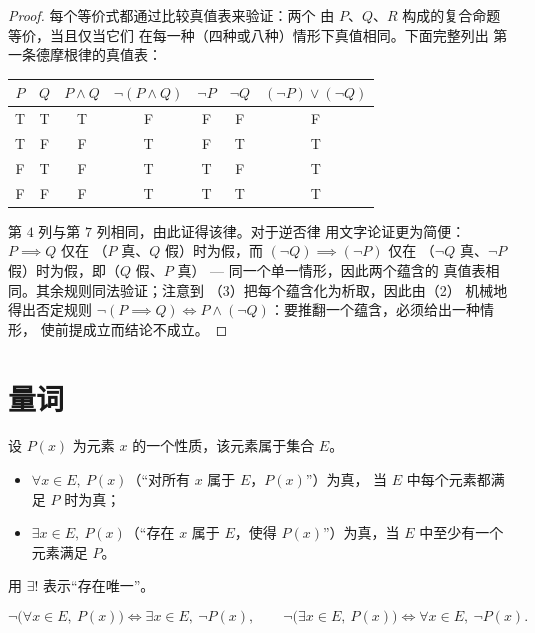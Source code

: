 \begin{proof}
每个等价式都通过比较真值表来验证：两个
由 $P$、$Q$、$R$ 构成的复合命题等价，当且仅当它们
在每一种（四种或八种）情形下真值相同。下面完整列出
第一条德摩根律的真值表：
\begin{center}
\begin{tabular}{cc|c|c|cc|c}
$P$ & $Q$ & $P \land Q$ & $\lnot(P \land Q)$ & $\lnot P$ & $\lnot Q$ &
$(\lnot P) \lor (\lnot Q)$ \\
\hline
T & T & T & F & F & F & F \\
T & F & F & T & F & T & T \\
F & T & F & T & T & F & T \\
F & F & F & T & T & T & T \\
\end{tabular}
\end{center}
第 $4$ 列与第 $7$ 列相同，由此证得该律。对于逆否律
用文字论证更为简便：$P \implies Q$ 仅在
（$P$ 真、$Q$ 假）时为假，而 $(\lnot Q) \implies (\lnot P)$ 仅在
（$\lnot Q$ 真、$\lnot P$ 假）时为假，即（$Q$
假、$P$ 真） --- 同一个单一情形，因此两个蕴含的
真值表相同。其余规则同法验证；注意到
（3）把每个蕴含化为析取，因此由（2）
机械地得出否定规则 $\lnot(P \implies Q) \iff P
\land (\lnot Q)$：要推翻一个蕴含，必须给出一种情形，
使前提成立而结论不成立。
\end{proof}

\section{量词}

\begin{definition}[量词]\label{def:b1:logic:quantifiers}
设 $P(x)$ 为元素 $x$ 的一个性质，该元素属于集合 $E$。
\begin{itemize}
  \item $\forall x \in E,\ P(x)$（“对所有 $x$ 属于 $E$，$P(x)$”）为真，
        当 $E$ 中每个元素都满足 $P$ 时为真；
  \item $\exists x \in E,\ P(x)$（“存在 $x$ 属于 $E$，使得
        $P(x)$”）为真，当 $E$ 中至少有一个元素满足
        $P$。
\end{itemize}
用 $\exists!$ 表示“存在唯一”。
\end{definition}

\begin{proposition}[量词的否定]\label{prop:b1:logic:negquant}
\[
\lnot\bigl(\forall x \in E,\ P(x)\bigr) \iff
\exists x \in E,\ \lnot P(x),
\qquad
\lnot\bigl(\exists x \in E,\ P(x)\bigr) \iff
\forall x \in E,\ \lnot P(x).
\]
\end{proposition}

